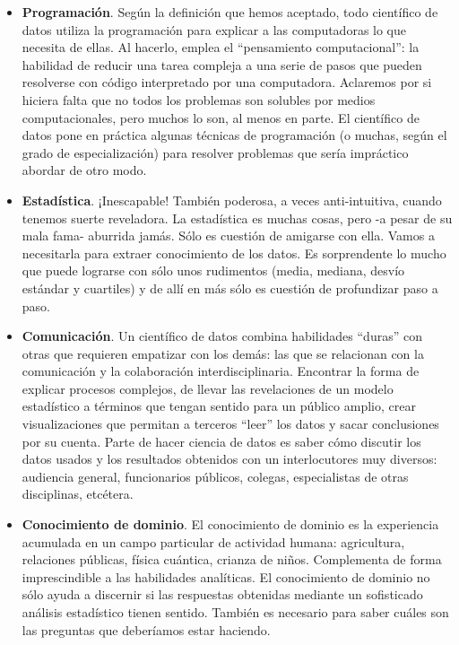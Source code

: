 \documentclass[]{book}
\begin{document}
\begin{itemize}
\item
  \textbf{Programación}. Según la definición que hemos aceptado, todo
  científico de datos utiliza la programación para explicar a las
  computadoras lo que necesita de ellas. Al hacerlo, emplea el
  ``pensamiento computacional'': la habilidad de reducir una tarea
  compleja a una serie de pasos que pueden resolverse con código
  interpretado por una computadora. Aclaremos por si hiciera falta que
  no todos los problemas son solubles por medios computacionales, pero
  muchos lo son, al menos en parte. El científico de datos pone en
  práctica algunas técnicas de programación (o muchas, según el grado de
  especialización) para resolver problemas que sería impráctico abordar
  de otro modo.
\item
  \textbf{Estadística}. ¡Inescapable! También poderosa, a veces
  anti-intuitiva, cuando tenemos suerte reveladora. La estadística es
  muchas cosas, pero -a pesar de su mala fama- aburrida jamás. Sólo es
  cuestión de amigarse con ella. Vamos a necesitarla para extraer
  conocimiento de los datos. Es sorprendente lo mucho que puede lograrse
  con sólo unos rudimentos (media, mediana, desvío estándar y cuartiles)
  y de allí en más sólo es cuestión de profundizar paso a paso.
\item
  \textbf{Comunicación}. Un científico de datos combina habilidades
  ``duras'' con otras que requieren empatizar con los demás: las que se
  relacionan con la comunicación y la colaboración interdisciplinaria.
  Encontrar la forma de explicar procesos complejos, de llevar las
  revelaciones de un modelo estadístico a términos que tengan sentido
  para un público amplio, crear visualizaciones que permitan a terceros
  ``leer'' los datos y sacar conclusiones por su cuenta. Parte de hacer
  ciencia de datos es saber cómo discutir los datos usados y los
  resultados obtenidos con un interlocutores muy diversos: audiencia
  general, funcionarios públicos, colegas, especialistas de otras
  disciplinas, etcétera.
\item
  \textbf{Conocimiento de dominio}. El conocimiento de dominio es la
  experiencia acumulada en un campo particular de actividad humana:
  agricultura, relaciones públicas, física cuántica, crianza de niños.
  Complementa de forma imprescindible a las habilidades analíticas. El
  conocimiento de dominio no sólo ayuda a discernir si las respuestas
  obtenidas mediante un sofisticado análisis estadístico tienen sentido.
  También es necesario para saber cuáles son las preguntas que
  deberíamos estar haciendo.
\end{itemize}
\end{document}
